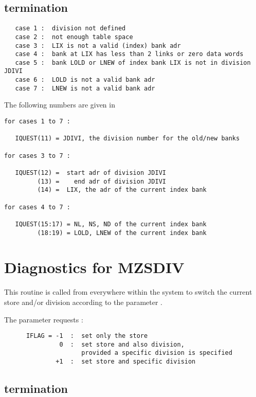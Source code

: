 
\subsection*{ termination}

\begin{verbatim}
   case 1 :  division not defined
   case 2 :  not enough table space
   case 3 :  LIX is not a valid (index) bank adr
   case 4 :  bank at LIX has less than 2 links or zero data words
   case 5 :  bank LOLD or LNEW of index bank LIX is not in division JDIVI
   case 6 :  LOLD is not a valid bank adr
   case 7 :  LNEW is not a valid bank adr
\end{verbatim}

The following numbers are given in 

\begin{verbatim}
for cases 1 to 7 :

   IQUEST(11) = JDIVI, the division number for the old/new banks

for cases 3 to 7 :

   IQUEST(12) =  start adr of division JDIVI
         (13) =    end adr of division JDIVI
         (14) =  LIX, the adr of the current index bank

for cases 4 to 7 :

   IQUEST(15:17) = NL, NS, ND of the current index bank
         (18:19) = LOLD, LNEW of the current index bank
\end{verbatim}

\section{Diagnostics for MZSDIV}


This routine is called from everywhere within the system to switch
the current store and/or division according to the parameter .

The parameter  requests :

\begin{verbatim}
      IFLAG = -1  :  set only the store
               0  :  set store and also division,
                     provided a specific division is specified
              +1  :  set store and specific division
\end{verbatim}

\subsection*{ termination}

